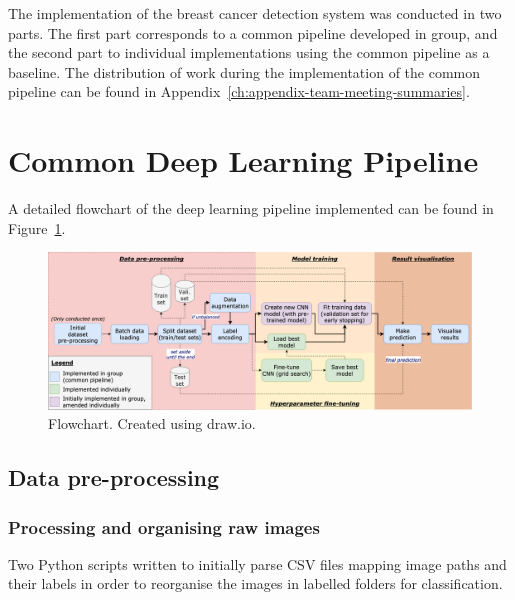 The implementation of the breast cancer detection system was conducted in two parts. The first part corresponds to a common pipeline developed in group, and the second part to individual implementations using the common pipeline as a baseline. The distribution of work during the implementation of the common pipeline can be found in Appendix~\ref{ch:appendix-team-meeting-summaries}.


\section{Common Deep Learning Pipeline}

A detailed flowchart of the deep learning pipeline implemented can be found in  Figure~\ref{fig:implementation-detailed-flowchart}.

\begin{figure}[ht]
\centerline{\includegraphics[width=1.25\textwidth]{Dissertation/figures/implementation/detailed flowchart.png}}
\caption{\label{fig:implementation-detailed-flowchart}Flowchart. Created using draw.io.}
\end{figure}


\subsection{Data pre-processing}

\subsubsection{Processing and organising raw images}

Two Python scripts written to initially parse CSV files mapping image paths and their labels in order to reorganise the images in labelled folders for classification.\\

